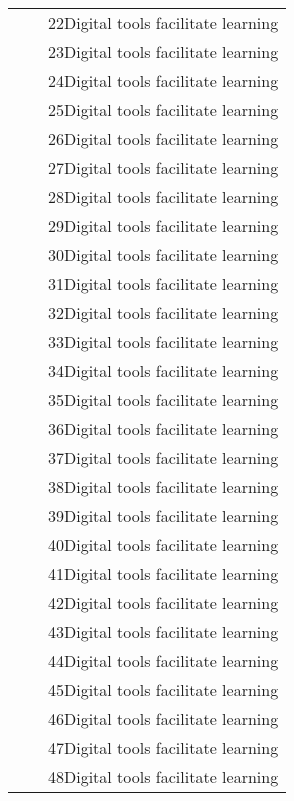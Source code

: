 \documentclass[a4paper,12pt]{article}\usepackage[]{graphicx}\usepackage[]{color}
\begin{document}
\begin{longtable}{H{72mm}m{0mm}m{75mm}}
   & \rule[-27mm]{0mm}{54mm} & 22Digital tools facilitate learning \\ 
   & \rule[-27mm]{0mm}{54mm} & 23Digital tools facilitate learning \\ 
   & \rule[-27mm]{0mm}{54mm} & 24Digital tools facilitate learning \\ 
   & \rule[-27mm]{0mm}{54mm} & 25Digital tools facilitate learning \\ 
   & \rule[-27mm]{0mm}{54mm} & 26Digital tools facilitate learning \\ 
   & \rule[-27mm]{0mm}{54mm} & 27Digital tools facilitate learning \\ 
   & \rule[-27mm]{0mm}{54mm} & 28Digital tools facilitate learning \\ 
   & \rule[-27mm]{0mm}{54mm} & 29Digital tools facilitate learning \\ 
   & \rule[-27mm]{0mm}{54mm} & 30Digital tools facilitate learning \\ 
   & \rule[-27mm]{0mm}{54mm} & 31Digital tools facilitate learning \\ 
   & \rule[-27mm]{0mm}{54mm} & 32Digital tools facilitate learning \\ 
   & \rule[-27mm]{0mm}{54mm} & 33Digital tools facilitate learning \\ 
   & \rule[-27mm]{0mm}{54mm} & 34Digital tools facilitate learning \\ 
   & \rule[-27mm]{0mm}{54mm} & 35Digital tools facilitate learning \\ 
   & \rule[-27mm]{0mm}{54mm} & 36Digital tools facilitate learning \\ 
   & \rule[-27mm]{0mm}{54mm} & 37Digital tools facilitate learning \\ 
   & \rule[-27mm]{0mm}{54mm} & 38Digital tools facilitate learning \\ 
   & \rule[-27mm]{0mm}{54mm} & 39Digital tools facilitate learning \\ 
   & \rule[-27mm]{0mm}{54mm} & 40Digital tools facilitate learning \\ 
   & \rule[-27mm]{0mm}{54mm} & 41Digital tools facilitate learning \\ 
   & \rule[-27mm]{0mm}{54mm} & 42Digital tools facilitate learning \\ 
   & \rule[-27mm]{0mm}{54mm} & 43Digital tools facilitate learning \\ 
   & \rule[-27mm]{0mm}{54mm} & 44Digital tools facilitate learning \\ 
   & \rule[-27mm]{0mm}{54mm} & 45Digital tools facilitate learning \\ 
   & \rule[-27mm]{0mm}{54mm} & 46Digital tools facilitate learning \\ 
   & \rule[-27mm]{0mm}{54mm} & 47Digital tools facilitate learning \\ 
   & \rule[-27mm]{0mm}{54mm} & 48Digital tools facilitate learning \\ 
  \hline
\end{longtable}
\end{document}
